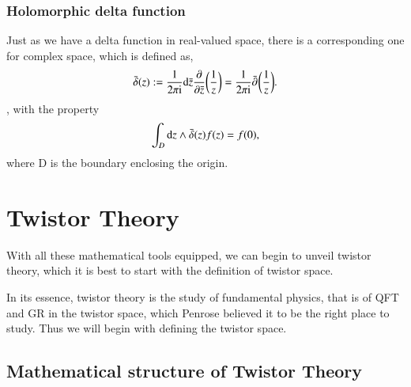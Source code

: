 \documentclass{article}
\begin{document}
    \subsubsection{Holomorphic delta function}%
      \label{sub:Name}
     Just as we have a delta function in real-valued space, there is a
     corresponding one for complex space, which is defined as,
     \begin{align}
      \label{holo delta function}
       \bar \delta (z) := \frac{1}{2\pi \textnormal{i}}
       \textnormal{d} \bar z \frac{\partial  }{\partial \bar z}
       \bigg{(} \frac{1}{z} \bigg{)} = \frac{1}{2\pi
       \textnormal{i}} \bar \partial_{}^{} \bigg{(} \frac{1}{z}
       \bigg{)}.
     \end{align}, with the property 
     \begin{align}
      \label{delta property}
       \int_D \textnormal{d}z \wedge \bar \delta(z) f(z) = f(0),
     \end{align}
      where D is the boundary enclosing the origin.
\section{Twistor Theory}

With all these mathematical tools equipped, we can begin to unveil
twistor theory, which it is best to start with the definition of twistor
space.


In its essence, twistor theory is the study of fundamental physics,
that is of QFT and GR in the twistor space, which Penrose believed it
to be the right place to study. Thus we will begin with defining the twistor
space.
\subsection{Mathematical structure of Twistor Theory}%
  \label{sub: Mathematical structure of Twistor Theory}
  
\end{document}
